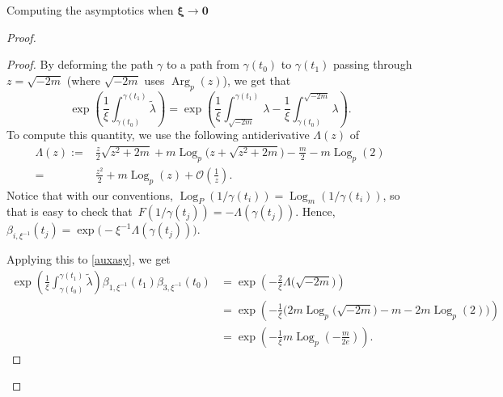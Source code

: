 \documentclass[11pt]{article}
\numberwithin{equation}{section}
\numberwithin{equation}{section}
\begin{document}
\begin{subsubsection}{Computing the asymptotics when $\boldsymbol{\xi \to 0}$}
\begin{proof}
\begin{proof}
By deforming the path $\gamma$ to a path from $\gamma(t_0)$ to $\gamma(t_1)$ passing through $z=\sqrt{-2m}$ (where $\sqrt{-2m}$ uses $\operatorname{Arg}_p(z)$), we get that
\begin{equation}\label{auxasy}
 \exp \left(\frac{1}{\xi}\int_{\gamma(t_0)}^{\gamma(t_1)}\widetilde{\lambda}\right)=\exp \left(\frac{1}{\xi}\int_{\sqrt{-2m}}^{\gamma(t_1)}\lambda -\frac{1}{\xi}\int_{\gamma(t_0)}^{\sqrt{-2m}}\lambda\right).
\end{equation}
To compute this quantity, we use the following antiderivative $\Lambda(z)$ of 
\begin{align*}
 \Lambda(z):=&{}\frac{z}{2}\sqrt{z^2+2m} + m\operatorname{Log}_p\bigl(z+\sqrt{z^2+2m}\bigr) -\frac{m}{2}-m\operatorname{Log}_p(2)\\
={}&\frac{z^2}{2}+m\operatorname{Log}_p(z)+\mathcal{O}\left(\frac{1}{z}\right).
\end{align*}
 Notice that with our conventions, $\operatorname{Log}_P(1/\gamma(t_i))=\operatorname{Log}_m(1/\gamma(t_i))$, so that is easy to check that~${F(1/\gamma(t_j))=-\Lambda(\gamma(t_j))}$. Hence, $\beta_{i,\xi^{-1}}(t_j)=\exp \bigl(-\xi^{-1}\Lambda(\gamma(t_j))\bigr)$.

Applying this to \eqref{auxasy}, we get
\begin{align*}
 \exp \left(\frac{1}{\xi}\int_{\gamma(t_0)}^{\gamma(t_1)}\widetilde{\lambda}\right)\beta_{1,\xi^{-1}}(t_1)\beta_{3,\xi^{-1}}(t_0)&=\exp \left(-\frac{2}{\xi}\Lambda\bigl(\sqrt{-2m}\bigr)\right)\\
 &=\exp \left(-\frac{1}{\xi}\bigl(2m\operatorname{Log}_p\bigl(\sqrt{-2m}\bigr) -m -2m\operatorname{Log}_p(2)\bigr)\right)\\
 &=\exp \left(-\frac{1}{\xi}m\operatorname{Log}_p\left(-\frac{m}{2e}\right)\right).\tag*{\qed}
\end{align*}\renewcommand{\qed}{}
\end{proof}


\end{proof}
\end{subsubsection}
\end{document}
